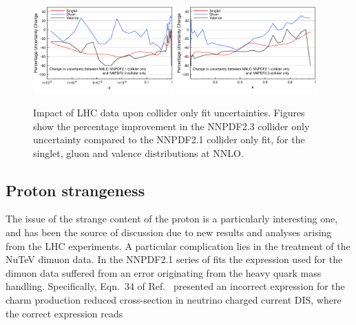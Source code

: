 \begin{figure}[h!]
\centering
\includegraphics[width=0.48\textwidth]{6-LHCimpact/figs/NNLOcollLogUnc.pdf}
\includegraphics[width=0.48\textwidth]{6-LHCimpact/figs/NNLOcollLinUnc.pdf}
\caption[Impact of LHC data upon collider only fit uncertainties]{Impact of LHC data upon collider only fit uncertainties. Figures show the percentage improvement in the NNPDF2.3 collider only uncertainty compared to the NNPDF2.1 collider only fit, for the singlet, gluon and valence distributions at NNLO.}
\label{fig:23vs21coll_unc}
\end{figure}



\subsection{Proton strangeness}
The issue of the strange content of the proton is a particularly interesting one, and has been the source of discussion due to new results and analyses arising from the LHC experiments. A particular complication lies in the treatment of the NuTeV dimuon data. 
In the NNPDF2.1 series of fits the expression used for the dimuon data suffered from an error originating from the heavy quark mass handling. Specifically, Eqn.~34 of Ref.~\cite{Ball:2011mu} presented an incorrect expression for the charm production reduced cross-section in neutrino charged current DIS, where the correct expression reads

